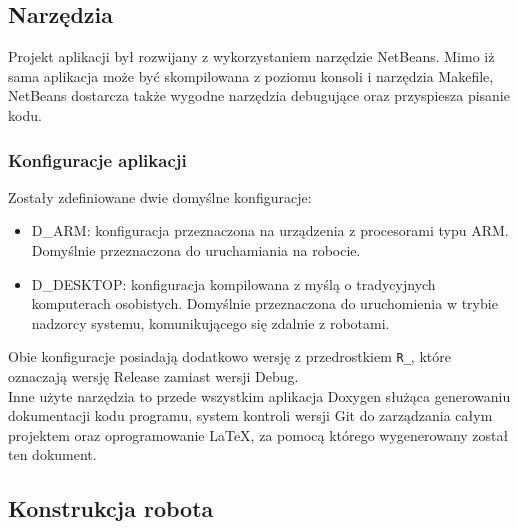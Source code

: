 \subsection{Narzędzia}
Projekt aplikacji był rozwijany z wykorzystaniem narzędzie NetBeans. Mimo iż sama aplikacja może być skompilowana z poziomu konsoli i narzędzia Makefile, NetBeans dostarcza także wygodne narzędzia debugujące oraz przyspiesza pisanie kodu.

\subsubsection{Konfiguracje aplikacji}
Zostały zdefiniowane dwie domyślne konfiguracje:
\begin{itemize}
    \item D\_ARM: konfiguracja przeznaczona na urządzenia z procesorami typu ARM. Domyślnie przeznaczona do uruchamiania na robocie.
    \item D\_DESKTOP: konfiguracja kompilowana z myślą o tradycyjnych komputerach osobistych. Domyślnie przeznaczona do uruchomienia w trybie nadzorcy systemu, komunikującego się zdalnie z robotami.
\end{itemize}
\noindent Obie konfiguracje posiadają dodatkowo wersję z przedrostkiem {\tt R\_}, które oznaczają wersję Release zamiast wersji Debug.\\

Inne użyte narzędzia to przede wszystkim aplikacja Doxygen służąca generowaniu dokumentacji kodu programu, system kontroli wersji Git do zarządzania całym projektem oraz oprogramowanie LaTeX, za pomocą którego wygenerowany został ten dokument.

\subsection{Konstrukcja robota}
